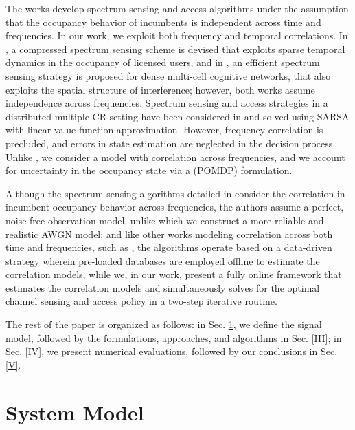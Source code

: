 \documentclass[10pt,twocolumn]{IEEEtran}
\newcommand{\sst}[1]{}
\newcommand{\nm}[1]{}
\newcommand{\add}[1]{{\color{red}{#1}}}
\begin{document}
The works \cite{7094730, 7895211} develop spectrum sensing and access algorithms under the assumption that the occupancy behavior of\sst{ the} incumbents\sst{ in the radio environment} is independent across \add{both} time and\sst{ across} frequencies. In our work, we exploit both frequency and temporal correlations. In \cite{7336513}, a compressed spectrum sensing scheme is devised that exploits sparse temporal dynamics in the occupancy of licensed users, and in \cite{8571293}, an efficient spectrum sensing strategy is proposed for dense multi-cell cognitive networks, that also exploits the spatial structure of interference; however, both works assume independence across frequencies. Spectrum sensing and access strategies in a distributed multiple CR setting have been considered in \cite{6507570} and solved using SARSA with linear value function approximation. However, frequency correlation is precluded, and errors in state estimation are neglected in the decision process. Unlike \cite{6507570}, we consider a model with correlation across frequencies, and we account for uncertainty in the occupancy state via a \add{partially observable Markov decision process} (POMDP) formulation. 

Although the spectrum sensing algorithms detailed in \cite{6956794} consider the correlation in incumbent occupancy behavior across frequencies, the authors assume a perfect, noise-free observation model, unlike which we construct a more reliable and realistic AWGN model; and like other works modeling correlation across both time and frequencies, such as \cite{4554696, 7032338}, the algorithms operate based on a  data-driven strategy wherein pre-loaded databases are employed offline to estimate the correlation models, while we, in our work, present a fully online framework that estimates the correlation models and simultaneously\nm{"Simultaneously" or  on a "two-step" process? It can't be both.} solves for the optimal channel sensing and access policy in a two-step iterative routine.
\nm{I am not understanding your point: Those papers estimate the correlation offline. In your paper, you FIRST estimate the correlation, and only AFTER that you optimize the policy..Practically, isn't it the same thing as estimating online?}

The rest of the paper is organized as follows: in Sec. \ref{II}, we define the signal model, followed by the formulations, approaches, and algorithms in Sec. \ref{III}; in Sec. \ref{IV}, we present
numerical evaluations, followed by our conclusions in Sec. \ref{V}.
\section{System Model}\label{II}
\end{document}
